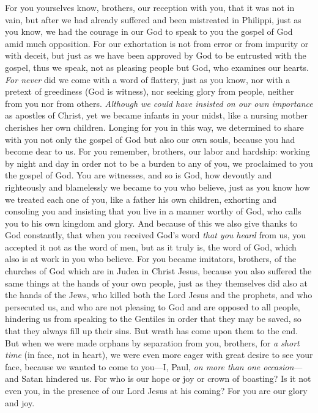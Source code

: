 \begin{biblechapter} %
 For you yourselves know, brothers, our reception with you, that it was not in vain,
\verse but after we had already suffered and been mistreated in Philippi, just as you know, we had the courage in our God to speak to you the gospel of God amid much opposition.
\verse For our exhortation is not from error or from impurity or with deceit,
\verse but just as we have been approved by God to be entrusted with the gospel, thus we speak, not as pleasing people but God, who examines our hearts.
\verse \textit{For never} did we come with a word of flattery, just as you know, nor with a pretext of greediness (God is witness),
\verse nor seeking glory from people, neither from you nor from others.
\verse \textit{Although we could have insisted on our own importance} as apostles of Christ, yet we became infants in your midst, like a nursing mother cherishes her own children.
\verse Longing for you in this way, we determined to share with you not only the gospel of God but also our own souls, because you had become dear to us.
\verse For you remember, brothers, our labor and hardship: working by night and day in order not to be a burden to any of you, we proclaimed to you the gospel of God.
\verse You are witnesses, and so is God, how devoutly and righteously and blamelessly we became to you who believe,
\verse just as you know how we treated each one of you, like a father his own children,
\verse exhorting and consoling you and insisting that you live in a manner worthy of God, who calls you to his own kingdom and glory.
 And because of this we also give thanks to God constantly, that when you received God’s word \textit{that you heard} from us, you accepted it not as the word of men, but as it truly is, the word of God, which also is at work in you who believe.
\verse For you became imitators, brothers, of the churches of God which are in Judea in Christ Jesus, because you also suffered the same things at the hands of your own people, just as they themselves did also at the hands of the Jews,
\verse who killed both the Lord Jesus and the prophets, and who persecuted us, and who are not pleasing to God and are opposed to all people,
\verse hindering us from speaking to the Gentiles in order that they may be saved, so that they always fill up their sins. But wrath has come upon them to the end.
 But when we were made orphans by separation from you, brothers, for \textit{a short time} (in face, not in heart), we were even more eager with great desire to see your face,
\verse because we wanted to come to you—I, Paul, \textit{on more than one occasion}—and Satan hindered us.
\verse For who is our hope or joy or crown of boasting? Is it not even you, in the presence of our Lord Jesus at his coming?
\verse For you are our glory and joy.
\end{biblechapter}

